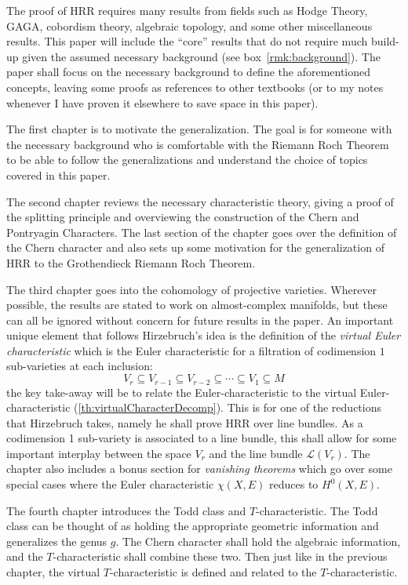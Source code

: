 \documentclass{ut-thesis}
\newcommand{\CL}{{\mathcal{L}}}
\newcommand{\sse}{\subseteq}
\begin{document}
The proof of HRR requires many results from fields such as Hodge Theory, GAGA, cobordism theory, algebraic
topology, and some other miscellaneous results. This paper will include the ``core'' results that do not require much
build-up given the assumed necessary background (see box~\ref{rmk:background}). The paper shall focus on the
necessary background to define the aforementioned concepts, leaving some proofs as references to other
textbooks (or to my notes whenever I have proven it elsewhere to save space in this paper).

The first chapter is to motivate the generalization. The goal is for someone with the necessary background
who is comfortable with the Riemann Roch Theorem to be able to follow the generalizations and understand the
choice of topics covered in this paper.

The second chapter reviews the necessary characteristic theory, giving a proof of the splitting
principle and overviewing the construction of the Chern and Pontryagin Characters. The last section of the
chapter goes over the definition of the Chern character and also sets up some motivation for the
generalization of HRR to the Grothendieck Riemann Roch Theorem.

The third chapter goes into the cohomology of projective varieties. Wherever possible, the results are stated
to work on almost-complex manifolds, but these can all be ignored without concern for future results in the
paper. An important unique element that follows Hirzebruch's idea is the definition of the \emph{virtual Euler
characteristic} which is the Euler characteristic for a filtration of codimension $1$ sub-varieties at each
inclusion:
\[
  V_r \sse V_{r-1} \sse V_{r-2} \sse \cdots \sse V_1 \sse M
\]
the key take-away will be to relate the Euler-characteristic to the virtual Euler-characteristic
(\cref{th:virtualCharacterDecomp}). This is for one of the reductions that Hirzebruch takes, namely he shall
prove HRR over line bundles. As a codimension 1 sub-variety is associated to a line bundle, this shall allow
for some important interplay between the space $V_r$ and the line bundle $\CL(V_r)$. The chapter also includes
a bonus section for \emph{vanishing theorems} which go over some special cases where the Euler characteristic
$\chi(X,E)$ reduces to $H^0(X, E)$.

The fourth chapter introduces the Todd class and $T$-characteristic. The Todd class can be thought of as holding
the appropriate geometric information and generalizes the genus $g$. The Chern character shall hold the
algebraic information, and the $T$-characteristic shall combine these two. Then just like in the
previous chapter, the virtual $T$-characteristic is defined and related to the $T$-characteristic.
\end{document}
